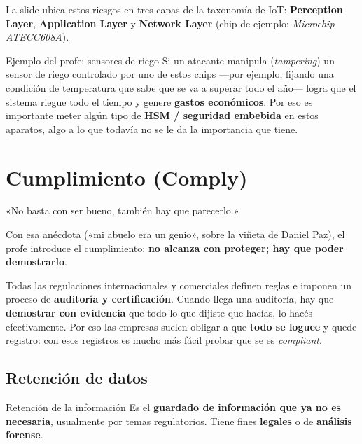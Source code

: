 \documentclass[11pt,a4paper]{article}
\begin{document}
La slide ubica estos riesgos en tres capas de la taxonomía de IoT: \textbf{Perception Layer},
\textbf{Application Layer} y \textbf{Network Layer} (chip de ejemplo: \emph{Microchip
ATECC608A}).

\begin{notebox}{Ejemplo del profe: sensores de riego}
Si un atacante manipula (\emph{tampering}) un sensor de riego controlado por uno de estos
chips —por ejemplo, fijando una condición de temperatura que sabe que se va a superar todo el
año— logra que el sistema riegue todo el tiempo y genere \textbf{gastos económicos}. Por eso
es importante meter algún tipo de \textbf{HSM / seguridad embebida} en estos aparatos, algo a
lo que todavía no se le da la importancia que tiene.
\end{notebox}

\section{Cumplimiento (Comply)}

\begin{redslide}
«No basta con ser bueno, también hay que parecerlo.»
\end{redslide}
\noindent Con esa anécdota («mi abuelo era un genio», sobre la viñeta de Daniel Paz), el profe
introduce el cumplimiento: \textbf{no alcanza con proteger; hay que poder demostrarlo}.

Todas las regulaciones internacionales y comerciales definen reglas e imponen un proceso de
\textbf{auditoría y certificación}. Cuando llega una auditoría, hay que \textbf{demostrar con
evidencia} que todo lo que dijiste que hacías, lo hacés efectivamente. Por eso las empresas
suelen obligar a que \textbf{todo se loguee} y quede registro: con esos registros es mucho más
fácil probar que se es \emph{compliant}.

\subsection{Retención de datos}

\begin{defbox}{Retención de la información}
Es el \textbf{guardado de información que ya no es necesaria}, usualmente por temas
regulatorios. Tiene fines \textbf{legales} o de \textbf{análisis forense}.
\end{defbox}
\end{document}
